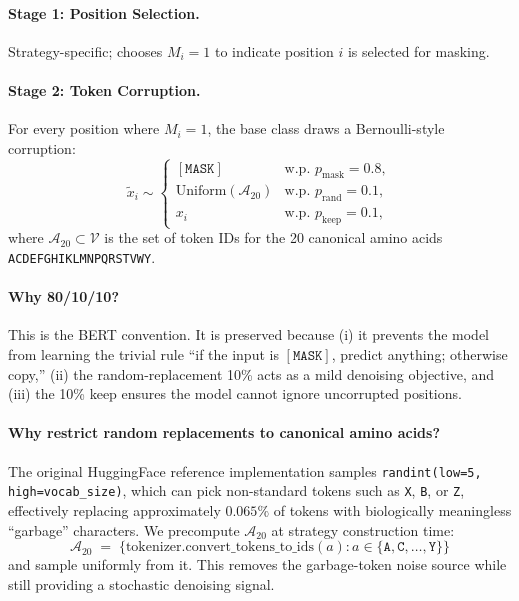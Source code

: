 \documentclass[11pt]{article}
\begin{document}
\paragraph{Stage 1: Position Selection.} Strategy-specific; chooses
$M_i = 1$ to indicate position $i$ is selected for masking.

\paragraph{Stage 2: Token Corruption.} For every position where $M_i = 1$,
the base class draws a Bernoulli-style corruption:
\begin{equation}
\tilde{x}_i \sim \begin{cases}
[\texttt{MASK}] & \text{w.p. } p_{\text{mask}} = 0.8, \\
\text{Uniform}(\mathcal{A}_{20}) & \text{w.p. } p_{\text{rand}} = 0.1, \\
x_i & \text{w.p. } p_{\text{keep}} = 0.1,
\end{cases}
\label{eq:bert-80-10-10}
\end{equation}
where $\mathcal{A}_{20} \subset \mathcal{V}$ is the set of token IDs
for the 20 canonical amino acids \texttt{ACDEFGHIKLMNPQRSTVWY}.

\paragraph{Why 80/10/10?} This is the BERT convention. It is preserved
because (i) it prevents the model from learning the trivial rule
``if the input is $[\texttt{MASK}]$, predict anything; otherwise copy,''
(ii) the random-replacement 10\% acts as a mild denoising objective,
and (iii) the 10\% keep ensures the model cannot ignore uncorrupted
positions.

\paragraph{Why restrict random replacements to canonical amino acids?}
The original HuggingFace reference implementation samples
\texttt{randint(low=5, high=vocab\_size)}, which can pick
non-standard tokens such as \texttt{X}, \texttt{B}, or \texttt{Z},
effectively replacing approximately $0.065\%$ of tokens with
biologically meaningless ``garbage'' characters. We precompute
$\mathcal{A}_{20}$ at strategy construction time:
\begin{equation}
\mathcal{A}_{20} \;=\; \{\text{tokenizer.convert\_tokens\_to\_ids}(a) : a \in \{\texttt{A},\texttt{C},\dots,\texttt{Y}\}\}
\end{equation}
and sample uniformly from it. This removes the garbage-token noise
source while still providing a stochastic denoising signal.
\end{document}
